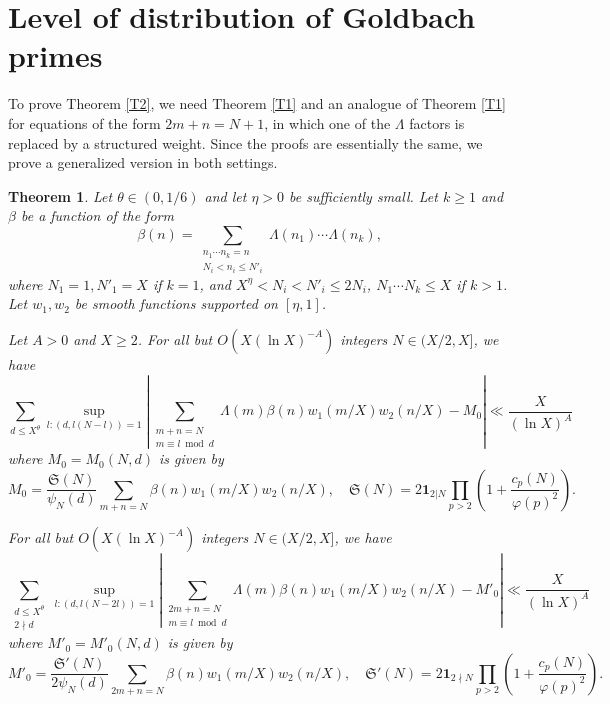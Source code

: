 \documentclass[10pt,a4paper]{amsart}
\newtheorem{thm}[dfn]{Theorem}
\newcommand{\1}{
    \bm{1}
}
\begin{document}
\section{Level of distribution of Goldbach primes}




To prove Theorem \ref{T2}, we need Theorem \ref{T1} and an analogue of Theorem \ref{T1} for equations of the form $2m+n=N+1$, in which one of the $\Lambda$ factors is replaced by a structured weight. 
Since the proofs are essentially the same, we prove a generalized version in both settings. 


\begin{thm}\label{T1p}
Let $\theta \in (0,1/6)$ and let $\eta>0$ be sufficiently small. 
Let $k \geq 1$ and $\beta$ be a function of the form
\[ \beta(n) = \sum_{\substack{n_1 \cdots n_k=n \\ N_i<n_i \leq N'_i}} \Lambda(n_1) \cdots \Lambda(n_k), \]
where $N_1=1,N'_1=X$ if $k=1$, and $X^{\eta}<N_i <N'_i \leq 2N_i$, $N_1 \cdots N_k \leq X$ if $k>1$. 
Let $w_1,w_2$ be smooth functions supported on $[\eta,1]$. 

Let $A>0$ and $X \geq 2$. For all but $O(X(\ln{X})^{-A})$ integers $N \in (X/2,X]$, we have
\[ \sum_{d \leq X^{\theta}} \sup_{l:(d,l(N-l))=1} \left| \sum_{\substack{m+n=N \\ m \equiv l \bmod d}} \Lambda(m) \beta(n) w_1(m/X) w_2(n/X) - M_0 \right| \ll \frac{X}{(\ln{X})^A} \]
where $M_0=M_0(N,d)$ is given by
\[ M_0 = \frac{\mathfrak{S}(N)}{\psi_N(d)} \sum_{m+n=N} \beta(n) w_1(m/X) w_2(n/X), \quad \mathfrak{S}(N) = 2 \1_{2 | N} \prod_{p>2} \left( 1 + \frac{c_p(N)}{\varphi(p)^2} \right). \]

For all but $O(X(\ln{X})^{-A})$ integers $N \in (X/2,X]$, we have
\[ \sum_{\substack{d \leq X^{\theta} \\ 2 \nmid d}} \sup_{l:(d,l(N-2l))=1} \left| \sum_{\substack{2m+n=N \\ m \equiv l \bmod d}} \Lambda(m) \beta(n) w_1(m/X) w_2(n/X) - M'_0 \right| \ll \frac{X}{(\ln{X})^A} \]
where $M'_0=M'_0(N,d)$ is given by
\[ M'_0 = \frac{\mathfrak{S}'(N)}{2\psi_N(d)} \sum_{2m+n=N} \beta(n) w_1(m/X) w_2(n/X), \quad \mathfrak{S}'(N) = 2 \1_{2 \nmid N} \prod_{p>2} \left( 1 + \frac{c_p(N)}{\varphi(p)^2} \right). \]
\end{thm}
\end{document}

